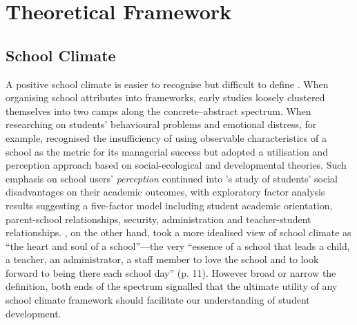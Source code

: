 \section{Theoretical Framework}\label{chp:2}

\subsection{School Climate}\label{sec:sc}

A positive school climate is easier to recognise but difficult to define \citep{PISAvol3}. When organising school attributes into frameworks, early studies loosely clustered themselves into two camps along the concrete--abstract spectrum. When researching on students' behavioural problems and emotional distress, for example, \citet{kuperminc:1997} recognised the insufficiency of using observable characteristics of a school as the metric for its managerial success but adopted a utilisation and perception approach based on social-ecological and developmental theories. Such emphasis on school users' \emph{perception} continued into \citet{esposito:1999}'s study of students' social disadvantages on their academic outcomes, with exploratory factor analysis results suggesting a five-factor model including student academic orientation, parent-school relationships, security, administration and teacher-student relationships. \citet{freiberg:1999}, on the other hand, took a more idealised view of school climate as ``the heart and soul of a school''---the very ``essence of a school that leads a child, a teacher, an administrator, a staff member to love the school and to look forward to being there each school day'' (p. 11). However broad or narrow the definition, both ends of the spectrum signalled that the ultimate utility of any school climate framework should facilitate our understanding of student development.

